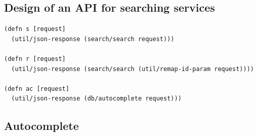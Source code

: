\subsection{Design of an API for searching services}


\lstset{language=Clojure}
\begin{lstlisting}[label=lst:api-handlers,caption={%
      [API ring handler implementations]
      API ring handler implementations, taken from \texttt{api.clj}.}]
(defn s [request]
  (util/json-response (search/search request)))

(defn r [request]
  (util/json-response (search/search (util/remap-id-param request))))

(defn ac [request]
  (util/json-response (db/autocomplete request)))
\end{lstlisting}

\subsection{Autocomplete}

